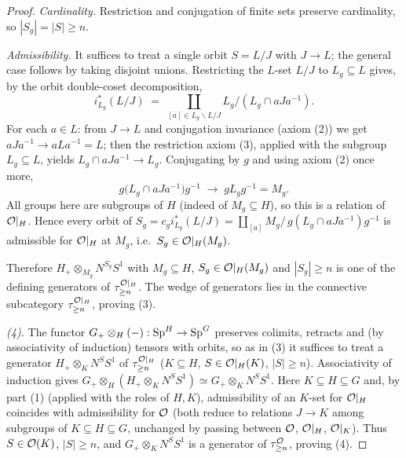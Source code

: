 \begin{proof}
\emph{Cardinality.} Restriction and conjugation of finite sets preserve
cardinality, so $|S_g|=|S|\ge n$.

\emph{Admissibility.} It suffices to treat a single orbit $S=L/J$ with $J\to L$;
the general case follows by taking disjoint unions. Restricting the $L$-set $L/J$
to $L_g\subseteq L$ gives, by the orbit double-coset decomposition,
\[
i_{L_g}^\ast(L/J)\;=\;\coprod_{[a]\in L_g\backslash L/J} L_g/(L_g\cap aJa^{-1}) .
\]
For each $a\in L$: from $J\to L$ and conjugation invariance (axiom (2)) we get
$aJa^{-1}\to aLa^{-1}=L$; then the restriction axiom (3), applied with the
subgroup $L_g\subseteq L$, yields $L_g\cap aJa^{-1}\to L_g$. Conjugating by $g$ and
using axiom (2) once more,
\[
g\bigl(L_g\cap aJa^{-1}\bigr)g^{-1}\;\to\; gL_gg^{-1}=M_g .
\]
All groups here are subgroups of $H$ (indeed of $M_g\subseteq H$), so this is a
relation of $\mathcal{O}|_H$. Hence every orbit of
$S_g=c_g i_{L_g}^\ast(L/J)=\coprod_{[a]} M_g/\,g(L_g\cap aJa^{-1})g^{-1}$ is
admissible for $\mathcal{O}|_H$ at $M_g$, i.e.\ $S_g\in\mathcal{O}|_H(M_g)$.

Therefore $H_+\otimes_{M_g}N^{S_g}S^1$ with $M_g\subseteq H$, $S_g\in\mathcal{O}|_H(M_g)$
and $|S_g|\ge n$ is one of the defining generators of $\tau^{\mathcal{O}|_H}_{\ge n}$.
The wedge of generators lies in the connective subcategory $\tau^{\mathcal{O}|_H}_{\ge n}$, proving (3).

\emph{(4).} The functor $G_+\otimes_H(-):\mathrm{Sp}^H\to\mathrm{Sp}^G$ preserves colimits,
retracts and (by associativity of induction) tensors with orbits, so as in (3) it
suffices to treat a generator $H_+\otimes_K N^S S^1$ of $\tau^{\mathcal{O}|_H}_{\ge n}$
($K\subseteq H$, $S\in\mathcal{O}|_H(K)$, $|S|\ge n$). Associativity of induction gives
$G_+\otimes_H(H_+\otimes_K N^S S^1)\simeq G_+\otimes_K N^S S^1$. Here $K\subseteq H
\subseteq G$ and, by part (1) (applied with the roles of $H,K$), admissibility of an
$K$-set for $\mathcal{O}|_H$ coincides with admissibility for $\mathcal{O}$ (both reduce to
relations $J\to K$ among subgroups of $K\subseteq H\subseteq G$, unchanged by passing
between $\mathcal{O}$, $\mathcal{O}|_H$, $\mathcal{O}|_K$). Thus $S\in\mathcal{O}(K)$, $|S|\ge n$, and
$G_+\otimes_K N^S S^1$ is a generator of $\tau^{\mathcal{O}}_{\ge n}$, proving (4).
\end{proof}

